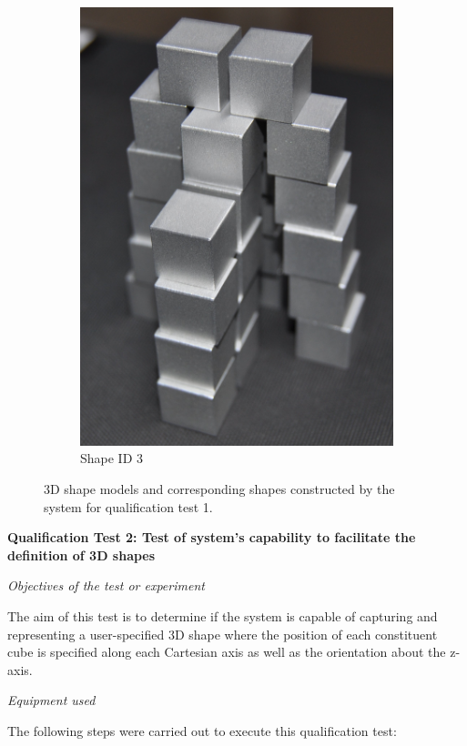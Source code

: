 \begin{figure}[!ht]
\begin{subfigure}{.20833\textwidth}
		\includegraphics[width=.95\linewidth]{figures/qtp1-shape3.jpg}
		\caption{Shape ID 3}
		\label{fig:qtp1-shape3}
	\end{subfigure}
	\caption{3D shape models and corresponding shapes constructed by the system for qualification test 1.}
	\label{fig:qtp1-results}
\end{figure}

\textbf{Qualification Test 2: Test of system's capability to facilitate the definition of 3D shapes}

\textit{Objectives of the test or experiment}

The aim of this test is to determine if the system is capable of capturing and representing a user-specified 3D shape where the position of each constituent cube is specified along each Cartesian axis as well as the orientation about the z-axis.

\textit{Equipment used}

The following steps were carried out to execute this qualification test:

